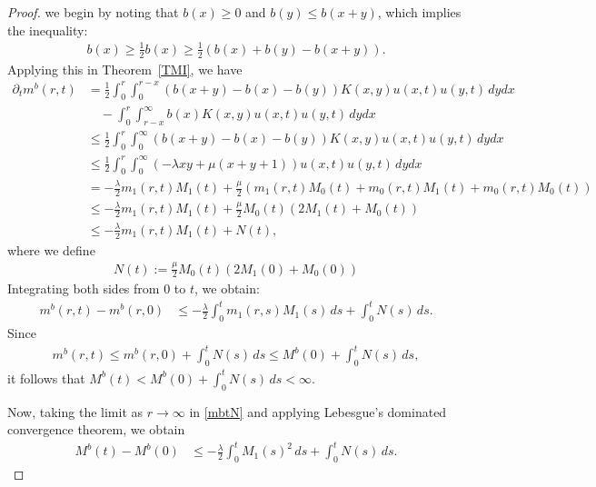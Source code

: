 \documentclass[a4paper,11pt]{article}
\begin{document}
\begin{proof}
we begin by noting that $b(x)\ge 0$ and $b(y)\le b(x+y)$,
which implies the inequality:
\begin{align*}
b(x)\ge \frac{1}{2}b(x)\ge \frac{1}{2}(b(x)+b(y)-b(x+y)).
\end{align*}
Applying this in Theorem~\ref{TMI}, we have
\begin{align*}
\partial_t m^b (r,t) &=\frac{1}{2} \int^r_0\int^{r-x}_0 
(b(x+y)-b(x)-b(y))K(x,y)u(x,t)u(y,t)\,dydx \\
&\quad -\int^r_0\int^\infty_{r-x} b(x)K(x,y)u(x,t) u(y,t)\,dydx \\
&\leq \frac{1}{2}\int^r_0\int^{\infty}_0 
(b(x+y)-b(x)-b(y))K(x,y)u(x,t)u(y,t)\,dydx \\
&\leq \frac{1}{2}\int^r_0\int^{\infty}_0 
(-\lambda xy+\mu (x+y+1))u(x,t)u(y,t)\,dydx \\
&=-\frac{\lambda}{2}m_1(r,t)M_1(t)
+\frac{\mu}{2}\left(
m_1(r,t)M_0(t)+m_0(r,t)M_1(t)
+m_0(r,t)M_0(t)\right)\\
&\le 
-\frac{\lambda}{2}m_1(r,t)M_1(t)
+\frac{\mu}{2}M_0(t)(2M_1(t)+M_0(t))\\
&\le 
-\frac{\lambda}{2}m_1(r,t)M_1(t)
+N(t),
\end{align*}
where we define
\begin{align*}
N(t):=\frac{\mu}{2}M_0(t)(2M_1(0)+M_0(0))
\end{align*}
Integrating both sides from $0$ to $t$,
we obtain:
\begin{align}\label{mbtN}
m^b (r,t)-m^b (r,0)
&\le
-\frac{\lambda}{2}\int_{0}^{t}
m_1(r,s)M_1(s)\,ds
+\int_0^tN(s)\,ds.
\end{align}
Since 
\begin{align*}
m^b (r,t)\le m^b (r,0) +\int_0^tN(s)\,ds\le M^b(0)+\int_0^tN(s)\,ds,
\end{align*}
it follows that $M^b(t)< M^b(0)+\int_0^tN(s)\,ds<\infty$.

Now, taking the limit as $r\to\infty$ in \eqref{mbtN} and applying Lebesgue's dominated convergence theorem, we obtain
\begin{align}\label{MMN}
M^b(t)-M^b(0)&\leq
-\frac{\lambda}{2}\int_{0}^{t}
M_1(s)^2\,ds
+\int_0^tN(s)\,ds.
\end{align}


\end{proof}
\end{document}
